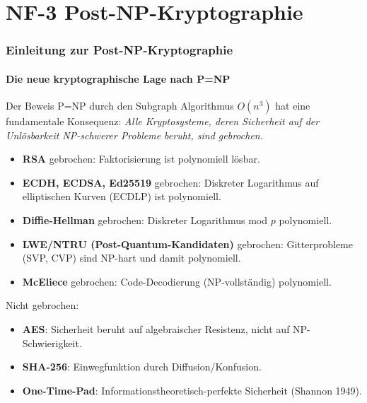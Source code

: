 ﻿\documentclass[a4paper,12pt]{scrreprt}
\theoremstyle{definition}
\begin{document}
\part{NF-3 \quad Post-NP-Kryptographie}
\label{part:nf3}

\section{Einleitung zur Post-NP-Kryptographie}

\subsection{Die neue kryptographische Lage nach P=NP}

Der Beweis P=NP durch den Subgraph Algorithmus $O(n^3)$ hat eine
fundamentale Konsequenz: \emph{Alle Kryptosysteme, deren Sicherheit auf
der Unlösbarkeit NP-schwerer Probleme beruht, sind gebrochen.}

\begin{itemize}
  \item \textbf{RSA} gebrochen: Faktorisierung ist polynomiell lösbar.
  \item \textbf{ECDH, ECDSA, Ed25519} gebrochen: Diskreter Logarithmus
    auf elliptischen Kurven (ECDLP) ist polynomiell.
  \item \textbf{Diffie-Hellman} gebrochen: Diskreter Logarithmus mod $p$
    polynomiell.
  \item \textbf{LWE/NTRU (Post-Quantum-Kandidaten)} gebrochen:
    Gitterprobleme (SVP, CVP) sind NP-hart und damit polynomiell.
  \item \textbf{McEliece} gebrochen: Code-Decodierung (NP-vollständig)
    polynomiell.
\end{itemize}

Nicht gebrochen:
\begin{itemize}
  \item \textbf{AES}: Sicherheit beruht auf algebraischer Resistenz, nicht
    auf NP-Schwierigkeit.
  \item \textbf{SHA-256}: Einwegfunktion durch Diffusion/Konfusion.
  \item \textbf{One-Time-Pad}: Informationstheoretisch-perfekte Sicherheit
    (Shannon 1949).
\end{itemize}
\end{document}
